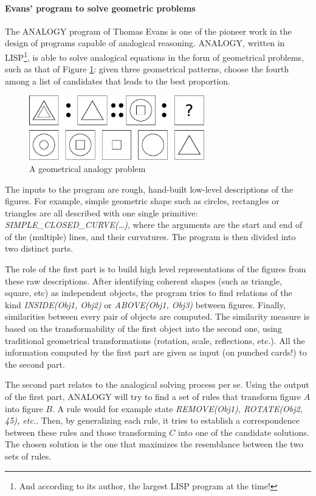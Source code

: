 \paragraph{Evans' program to solve geometric problems\\}

The ANALOGY program of Thomas Evans \cite{Eva64} is one of the pioneer work in
the design of programs capable of analogical reasoning. ANALOGY, written in
LISP\footnote{And according to its author, the largest LISP program at the
time!}, is able to solve analogical equations in the form of geometrical
problems, such as that of Figure \ref{FIG:evans}: given three geometrical
patterns, choose the fourth among a list of candidates that leads to the best
proportion.

\begin{figure}[!h]
\centering
\includegraphics[width=3in]{figures/evans.pdf}
\caption{A geometrical analogy problem}
\label{FIG:evans}
\end{figure}

The inputs to the program are rough, hand-built low-level descriptions of the
figures. For example, simple geometric shape such as circles, rectangles or
triangles are all described with one single primitive:
\textit{SIMPLE\_CLOSED\_CURVE(\dots)}, where the arguments are the start and
end of of the (multiple) lines, and their curvatures. The program is then
divided into two distinct parts.

The role of the first part is to build high level representations of the
figures from these raw descriptions. After identifying coherent shapes (such as
triangle, square, etc) as independent objects, the program tries to find
relations of the kind \textit{INSIDE(Obj1, Obj2)} or \textit{ABOVE(Obj1, Obj3)}
between figures. Finally, similarities between every pair of objects are
computed. The similarity measure is based on the transformability of the first
object into the second one, using traditional geometrical transformations
(rotation, scale, reflections, etc.). All the information computed by the first
part are given as input (on punched cards!) to the second part.

The second part relates to the analogical solving process per se. Using the
output of the first part, ANALOGY will try to find a set of rules that
transform figure $A$ into figure $B$. A rule would for example state
\textit{REMOVE(Obj1), ROTATE(Obj2, 45\degree), etc.}. Then, by generalizing
each rule, it tries to establish a correspondence between these rules and those
transforming $C$ into one of the candidate solutions. The chosen solution is
the one that maximizes the resemblance between the two sets of rules.

